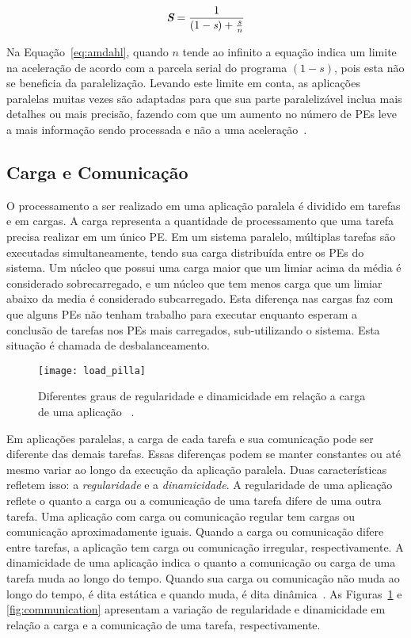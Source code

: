 \begin{equation}
\textit{\textbf{S}} = \frac{1}{(1-\textit{s}) + \frac{\textit{s}}{\textit{n}}}
\label{eq:amdahl}
\end{equation}

Na Equação~\ref{eq:amdahl}, quando $n$ tende ao infinito a equação indica um limite na aceleração de acordo com a parcela serial do programa $(1-s)$, pois esta não se beneficia da paralelização. 
Levando este limite em conta, as aplicações paralelas muitas vezes são adaptadas para que sua parte paralelizável inclua mais detalhes ou mais precisão, fazendo com que um aumento no número de PEs leve a mais informação sendo processada e não a uma aceleração~\cite{gustafson}.

\subsection{Carga e Comunicação}

O processamento a ser realizado em uma aplicação paralela é dividido em tarefas e em cargas. 
A carga representa a quantidade de processamento que uma tarefa precisa realizar em um único PE. 
Em um sistema paralelo, múltiplas tarefas são executadas simultaneamente, tendo sua carga distribuída entre os PEs do sistema. 
Um núcleo que possui uma carga maior que um limiar acima da média é considerado sobrecarregado, e um núcleo que tem menos carga que um limiar abaixo da media é considerado subcarregado. 
Esta diferença nas cargas faz com que alguns PEs não tenham trabalho para executar enquanto esperam a conclusão de tarefas nos PEs mais carregados, sub-utilizando o sistema. 
Esta situação é chamada de desbalanceamento.

\begin{figure} [b]
\texttt{[image: load\_pilla]}
\centering
\caption[Diferentes graus de regularidade e dinamicidade em relação a carga de uma aplicação.]{Diferentes graus de regularidade e dinamicidade em relação a carga de uma aplicação ~\cite{pilla-thesis}.}
\label{fig:load}
\end{figure}

Em aplicações paralelas, a carga de cada tarefa e sua comunicação pode ser diferente das demais tarefas. Essas diferenças podem se manter constantes ou até mesmo variar ao longo da execução da aplicação paralela. 
Duas características refletem isso: a \textit{regularidade} e a \textit{dinamicidade}. 
A regularidade de uma aplicação reflete o quanto a carga ou a comunicação de uma tarefa difere de uma outra tarefa. Uma aplicação com carga ou comunicação regular tem cargas ou comunicação aproximadamente iguais. 
Quando a carga ou comunicação difere entre tarefas, a aplicação tem carga ou comunicação irregular, respectivamente.
A dinamicidade de uma aplicação indica o quanto a comunicação ou carga de uma tarefa muda ao longo do tempo. Quando sua carga ou comunicação não muda ao longo do tempo, é dita estática e quando muda, é dita dinâmica~\cite{pilla-thesis}.
As Figuras~\ref{fig:load} e \ref{fig:communication} apresentam a variação de regularidade e dinamicidade em relação a carga e a comunicação de uma tarefa, respectivamente. 

